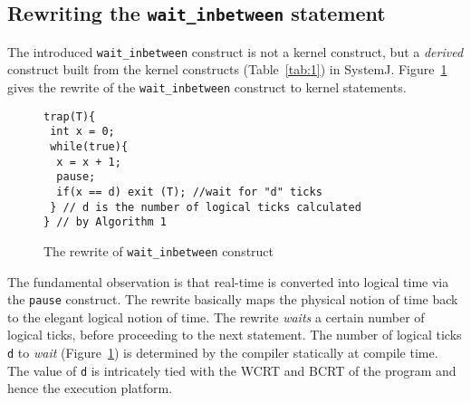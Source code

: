 
\subsection{Rewriting the \texttt{wait\_inbetween} statement}
\label{sec:rewr-delay-stat}

The introduced \texttt{wait\_inbetween} construct is not a kernel
construct, but a \textit{derived} construct built from the kernel
constructs (Table~\ref{tab:1}) in SystemJ. Figure~\ref{fig:3} gives the
rewrite of the \texttt{wait\_inbetween} construct to kernel statements.

\begin{figure}[tb]
	\vspace{-10pt}
    \begin{minipage}{\textwidth}
      \begin{lstlisting}[style=sysj,morekeywords={abort,await,emit,present,trap,pause,exit,delay,suspend}]
trap(T){
 int x = 0;
 while(true){
  x = x + 1;
  pause;
  if(x == d) exit (T); //wait for "d" ticks
 } // d is the number of logical ticks calculated
} // by Algorithm 1
\end{lstlisting}
    \end{minipage}
    \caption{The rewrite of \texttt{wait\_inbetween} construct}
    \label{fig:3}
\end{figure}

The fundamental observation is that real-time is converted into logical
time via the \texttt{pause} construct. The rewrite basically maps the
physical notion of time back to the elegant logical notion of time. The
rewrite \textit{waits} a certain number of logical ticks, before
proceeding to the next statement. The number of logical ticks \texttt{d}
to \textit{wait} (Figure~\ref{fig:3}) is determined by the compiler
statically at compile time. The value of \texttt{d} is intricately tied
with the WCRT and BCRT of the program and hence the execution platform.

